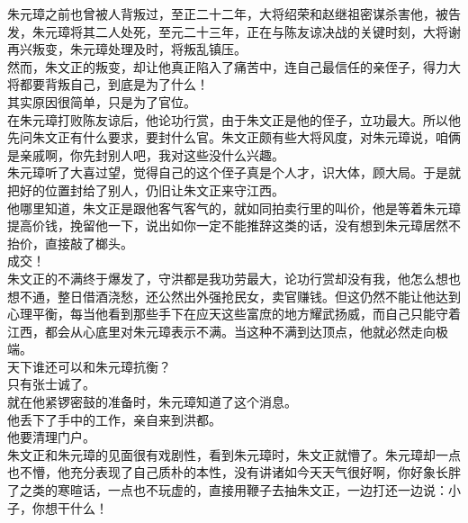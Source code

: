 \begin{multicols}{\theparacolNo}
朱元璋之前也曾被人背叛过，至正二十二年，大将绍荣和赵继祖密谋杀害他，被告发，朱元璋将其二人处死，至元二十三年，正在与陈友谅决战的关键时刻，大将谢再兴叛变，朱元璋处理及时，将叛乱镇压。\\

然而，朱文正的叛变，却让他真正陷入了痛苦中，连自己最信任的亲侄子，得力大将都要背叛自己，到底是为了什么！\\

其实原因很简单，只是为了官位。\\

在朱元璋打败陈友谅后，他论功行赏，由于朱文正是他的侄子，立功最大。所以他先问朱文正有什么要求，要封什么官。朱文正颇有些大将风度，对朱元璋说，咱俩是亲戚啊，你先封别人吧，我对这些没什么兴趣。\\

朱元璋听了大喜过望，觉得自己的这个侄子真是个人才，识大体，顾大局。于是就把好的位置封给了别人，仍旧让朱文正来守江西。\\

他哪里知道，朱文正是跟他客气客气的，就如同拍卖行里的叫价，他是等着朱元璋提高价钱，挽留他一下，说出如你一定不能推辞这类的话，没有想到朱元璋居然不抬价，直接敲了榔头。\\

成交！\\

朱文正的不满终于爆发了，守洪都是我功劳最大，论功行赏却没有我，他怎么想也想不通，整日借酒浇愁，还公然出外强抢民女，卖官赚钱。但这仍然不能让他达到心理平衡，每当他看到那些手下在应天这些富庶的地方耀武扬威，而自己只能守着江西，都会从心底里对朱元璋表示不满。当这种不满到达顶点，他就必然走向极端。\\

天下谁还可以和朱元璋抗衡？\\

只有张士诚了。\\

就在他紧锣密鼓的准备时，朱元璋知道了这个消息。\\

他丢下了手中的工作，亲自来到洪都。\\

他要清理门户。\\

朱文正和朱元璋的见面很有戏剧性，看到朱元璋时，朱文正就懵了。朱元璋却一点也不懵，他充分表现了自己质朴的本性，没有讲诸如今天天气很好啊，你好象长胖了之类的寒暄话，一点也不玩虚的，直接用鞭子去抽朱文正，一边打还一边说：小子，你想干什么！\\


\end{multicols}
